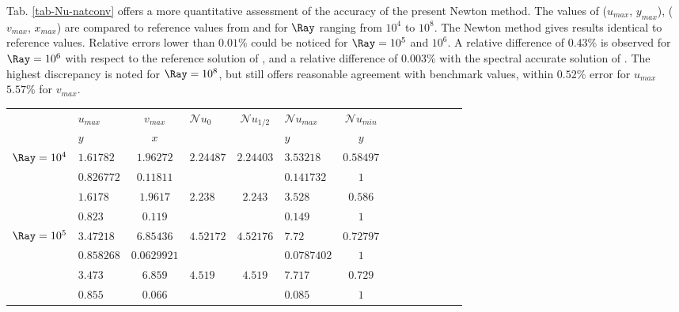 Tab. \ref{tab-Nu-natconv} offers a more quantitative assessment of the accuracy of the present Newton method. 
The values of ($u_{max}$, $y_{max}$), ($v_{max}$, $x_{max}$) are compared to reference values from \cite{de1983natural}  and \cite{LeQuere91} for $\Ray$ ranging from $10^4$ to $10^8$.
The Newton method gives results identical to reference values.
Relative errors lower than $0.01 \%$ could be noticed for $\Ray=10^5$ and $10^6$.
A relative difference of $0.43 \%$ is observed for $\Ray = 10^6$ with respect to the reference solution of \cite{de1983natural}, and a relative difference of $0.003 \%$ with the spectral accurate solution of \cite{LeQuere91}.
The highest discrepancy is noted for $\Ray = 10^8$, but still offers reasonable agreement with benchmark values, within $0.52 \%$ error for $u_{max}$  $5.57 \%$ for $v_{max}$.
\begin{table}
   \begin{center}
      \begin{tabular}{*{7}{cl}}
          & $u_{max}$ & $v_{max}$ & \multirow{2}{*}{$\mathcal{N}\!u_0$} & \multirow{2}{*}{$\mathcal{N}\!u_{1/2}$} & $\mathcal{N}\!u_{max}$ & $\mathcal{N}\!u_{min}$ \\ 
          & $y$ & $x$ & &  & $y$ & $y$ \\ \bottomrule
          \multirow{2}{*}{$\Ray = 10^4$} & $1.61782$ & $1.96272$ & \multirow{2}{*}{$2.24487$} & \multirow{2}{*}{$2.24403 $} & $3.53218$ & $0.58497$  \\
          & $0.826772$ & $0.11811$ & & & $0.141732$ & $1$ \\
          \multirow{2}{*}{\cite{de1983natural}} & $1.6178$ & $1.9617$ & $2.238$ & $2.243 $ & $3.528$ & $0.586$  \\
          & $0.823$ & $0.119$ & & & $0.149$ & $1$ \\ \hline
           
          \multirow{2}{*}{$\Ray = 10^5$} & $3.47218$ & $6.85436$ & \multirow{2}{*}{$4.52172$} & \multirow{2}{*}{$4.52176 $} & $7.72$ & $0.72797$  \\
          & $0.858268$ & $0.0629921$ & & & $0.0787402$ & $1$ \\
         \multirow{2}{*}{\cite{de1983natural}} & $3.473$ & $6.859$ & \multirow{2}{*}{$4.519$} & \multirow{2}{*}{$4.519 $} & $7.717$ & $0.729$  \\
         & $0.855$ & $0.066$ & & & $0.085$ & $1$ \\ \hline
         

\end{tabular}
\end{center}
\end{table}
